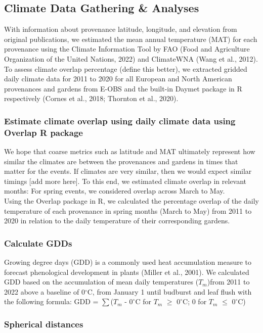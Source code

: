 \documentclass{article}
\begin{document}
\subsection{Climate Data Gathering \& Analyses}
With information about provenance latitude, longitude, and elevation from original publications, we estimated the mean annual temperature (MAT) for each provenance using the Climate Information Tool by FAO (Food and Agriculture Organization of the United Nations, 2022) and ClimateWNA (Wang et al., 2012). 
\\
To assess climate overlap percentage (define this better), we extracted gridded daily climate data for 2011 to 2020 for all European and North American provenances and gardens from E-OBS and the built-in Daymet package in R respectively (Cornes et al., 2018; Thornton et al., 2020).

\subsubsection{Estimate climate overlap using daily climate data using Overlap R package}
We hope that coarse metrics such as latitude and MAT ultimately represent how similar the climates are between the provenances and gardens in times that matter for the events. If climates are very similar, then we would expect similar timings [add more here].
To this end, we estimated climate overlap in relevant months: For spring events, we considered overlap across March to May.
\\
Using the Overlap package in R, we calculated the percentage overlap of the daily temperature of each provenance in spring months (March to May) from 2011 to 2020 in relation to the daily temperature of their corresponding gardens. 

\subsubsection{Calculate GDDs}

Growing degree days (GDD) is a commonly used heat accumulation measure to forecast phenological development in plants (Miller et al., 2001). We calculated GDD based on the accumulation of mean daily temperatures ($T_{m}$)from 2011 to 2022 above a baseline of 0$^{\circ}$C, from January 1 until budburst and leaf flush with the following formula: GDD = $\sum$($T_{m}$ - $0^{\circ}$C for $T_{m}$ $\ge$ $0^{\circ}$C; 0 for $T_{m}$ $\le$ $0^{\circ}$C) 


\subsubsection{Spherical distances}
\end{document}
